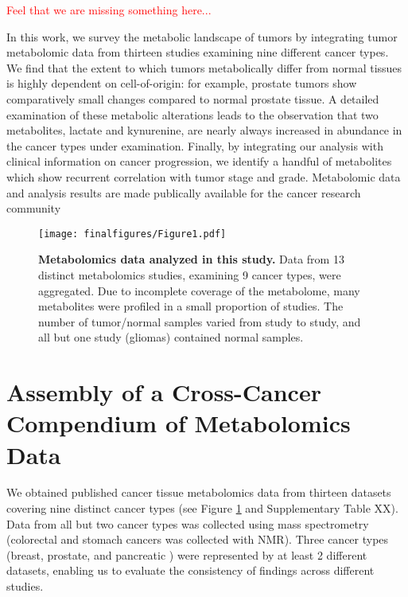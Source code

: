 \documentclass[10pt]{article}
\begin{document}
\textcolor{red}{Feel that we are missing something here...}

In this work, we survey the metabolic landscape of tumors by integrating tumor metabolomic data from thirteen studies examining nine different cancer types. We find that the extent to which tumors metabolically differ from normal tissues is highly dependent on cell-of-origin: for example, prostate tumors show comparatively small changes compared to normal prostate tissue. A detailed examination of these metabolic alterations leads to the observation that two metabolites, lactate and kynurenine, are nearly always increased in abundance in the cancer types under examination. Finally, by integrating our analysis with clinical information on cancer progression, we identify a handful of metabolites which show recurrent correlation with tumor stage and grade. Metabolomic data and analysis results are made publically available for the cancer research community


\begin{figure}[ht!]
  \centering
     \texttt{[image: finalfigures/Figure1.pdf]}
  \caption{\textbf{Metabolomics data analyzed in this study.} Data from 13 distinct metabolomics studies, examining 9 cancer types, were aggregated. Due to incomplete coverage of the metabolome, many metabolites were profiled in a small proportion of studies. The number of tumor/normal samples varied from study to study, and all but one study (gliomas) contained normal samples.}
     \label{fig:Fig1}
\end{figure}

\section{Assembly of a Cross-Cancer Compendium of Metabolomics Data}
We obtained published cancer tissue metabolomics data from thirteen datasets covering nine distinct cancer types (see Figure \ref{fig:Fig1} and Supplementary Table XX). Data from all but two cancer types was collected using mass spectrometry (colorectal and stomach cancers was collected with NMR). Three cancer types (breast, prostate, and pancreatic \cite{Hirayama2009}) were represented by at least 2 different datasets, enabling us to evaluate the consistency of findings across different studies. 
\end{document}
